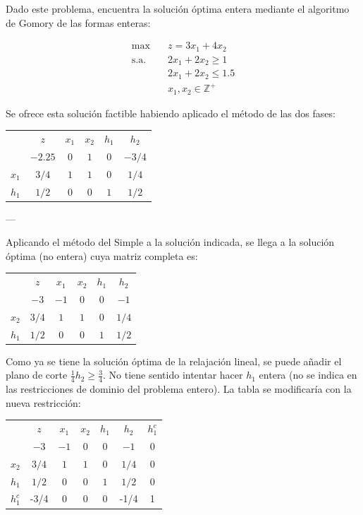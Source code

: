 Dado este problema, encuentra la solución óptima entera mediante el algoritmo de Gomory de las formas enteras:

\begin{align*}
\max \quad & z = 3x_1 + 4x_2 \\
\text{s.a.} \quad & 2x_1 + 2x_2 \geq 1 \\
                  & 2x_1 + 2x_2 \leq 1.5 \\
                  & x_1, x_2  \in \mathbb{Z^+}
\end{align*}

Se ofrece esta solución factible habiendo aplicado el método de las dos fases:

\begin{center}
\begin{tabular}{c|c|cccc|}
 & $z$ & $x_1$ & $x_2$ & $h_1$ & $h_2$ \\ 
 & $-2.25$ & $0$ & $1$ & $0$ & $-3/4$  \\ 
\hline
$x_1$ & $3/4$ & $1$ & $1$ & $0$ & $1/4$ \\ 
$h_1$ & $1/2$ & $0$ & $0$ & $1$ & $1/2$ \\ 
\hline
\end{tabular}
\end{center}

---

Aplicando el método del Simple a la solución indicada, se llega a la solución óptima (no entera) cuya matriz completa es: 

\begin{center}
\begin{tabular}{c|c|cccc|}
 & $z$ & $x_1$ & $x_2$ & $h_1$ & $h_2$ \\ 
 & $-3$ & $-1$ & $0$ & $0$ & $-1$  \\ 
\hline
$x_2$ & $3/4$ & $1$ & $1$ & $0$ & $1/4$ \\ 
$h_1$ & $1/2$ & $0$ & $0$ & $1$ & $1/2$ \\ 
\hline
\end{tabular}
\end{center}

Como ya se tiene la solución óptima de la relajación lineal, se puede añadir el plano de corte $\frac{1}{4} h_2 \geq \frac{3}{4}$. No tiene sentido intentar hacer $h_1$ entera (no se indica en las restricciones de dominio del problema entero). La tabla se modificaría con la nueva restricción:
\begin{center}
\begin{tabular}{c|c|ccccc|}
 & $z$ & $x_1$ & $x_2$ & $h_1$ & $h_2$ &  $h^c_1$\\ 
 & $-3$ & $-1$ & $0$ & $0$ & $-1$  & $0$ \\ 
\hline
$x_2$ & $3/4$ & $1$ & $1$ & $0$ & $1/4$ & $0$\\ 
$h_1$ & $1/2$ & $0$ & $0$ & $1$ & $1/2$ & $0$\\ 
$h^c_1$ & -3/4&0&0&0&-1/4&1\\
\hline
\end{tabular}
\end{center}

